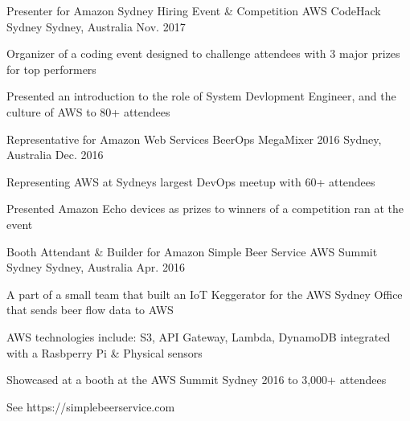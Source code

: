 

\begin{cventries}

  \cventry
    {Presenter for Amazon Sydney Hiring Event \& Competition} %
    {AWS CodeHack Sydney} %
    {Sydney, Australia} %
    {Nov. 2017} %
    {
      \begin{cvitems} %
        \item {Organizer of a coding event designed to challenge attendees with 3 major prizes for top performers}
        \item {Presented an introduction to the role of System Devlopment Engineer, and the culture of AWS to 80+ attendees}
      \end{cvitems}
    }

  \cventry
    {Representative for Amazon Web Services} %
    {BeerOps MegaMixer 2016} %
    {Sydney, Australia} %
    {Dec. 2016} %
    {
      \begin{cvitems} %
        \item {Representing AWS at Sydneys largest DevOps meetup with 60+ attendees}
        \item {Presented Amazon Echo devices as prizes to winners of a competition ran at the event}
      \end{cvitems}
    }

  \cventry
    {Booth Attendant \& Builder for Amazon Simple Beer Service} %
    {AWS Summit Sydney} %
    {Sydney, Australia} %
    {Apr. 2016} %
    {
      \begin{cvitems} %
        \item {A part of a small team that built an IoT Keggerator for the AWS Sydney Office that sends beer flow data to AWS}
        \item {AWS technologies include: S3, API Gateway, Lambda, DynamoDB integrated with a Rasbperry Pi \& Physical sensors}
        \item {Showcased at a booth at the AWS Summit Sydney 2016 to 3,000+ attendees}
        \item {See https://simplebeerservice.com}
      \end{cvitems}
    }
\end{cventries}
